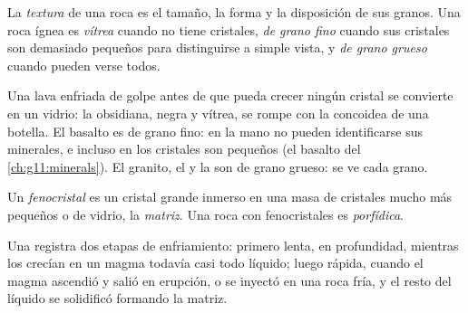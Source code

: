 \begin{definition}[Textura]\label{def:g11:igneous-rocks:texture}
La \emph{textura} de una roca es el tamaño, la
forma y la disposición de sus granos. Una roca ígnea es \emph{vítrea} cuando
no tiene cristales, \emph{de grano fino} cuando sus cristales son demasiado
pequeños para distinguirse a simple vista, y \emph{de grano grueso} cuando
pueden verse todos.
\end{definition}

Una lava enfriada de golpe antes de que pueda crecer ningún cristal se
convierte en un vidrio: la obsidiana, negra y vítrea, se rompe con la
 concoidea de una botella. El basalto es de grano fino: en la mano no
pueden identificarse sus minerales, e incluso en  los cristales
son pequeños (el basalto del \cref{ch:g11:minerals}). El granito, el  y
la  son de grano grueso: se ve cada grano.

\begin{definition}\label{def:g11:igneous-rocks:porphyritic}
Un \emph{fenocristal} es un cristal grande inmerso en una
masa de cristales mucho más pequeños o de vidrio, la \emph{matriz}. Una roca
con fenocristales es \emph{porfídica}.
\end{definition}

Una   registra dos etapas de enfriamiento: primero lenta, en
profundidad, mientras los  crecían en un magma todavía casi todo
líquido; luego rápida, cuando el magma ascendió y salió en erupción, o se
inyectó en una roca fría, y el resto del líquido se solidificó formando la
matriz.

